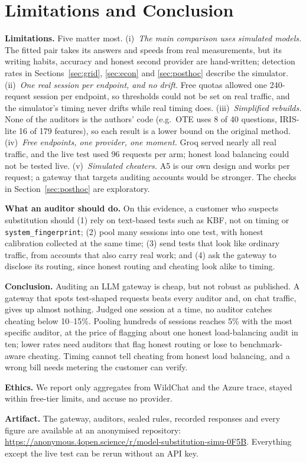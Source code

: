 \section{Limitations and Conclusion}\label{sec:conclusion}

\textbf{Limitations.} Five matter most.
(i)~\emph{The main comparison uses simulated models.} The fitted pair takes its answers and speeds
from real measurements, but its writing habits, accuracy and honest second provider are
hand-written; detection rates in Sections~\ref{sec:grid}, \ref{sec:econ} and \ref{sec:posthoc}
describe the simulator.
(ii)~\emph{One real session per endpoint, and no drift.} Free quotas allowed one 240-request session
per endpoint, so thresholds could not be set on real traffic, and the simulator's timing never drifts
while real timing does.
(iii)~\emph{Simplified rebuilds.} None of the auditors is the authors' code (e.g.\ OTE uses 8 of 40
questions, IRIS-lite 16 of 179 features), so each result is a lower bound on the original method.
(iv)~\emph{Free endpoints, one provider, one moment.} Groq served nearly all real traffic, and the
live test used 96 requests per arm; honest load balancing could not be tested live.
(v)~\emph{Simulated cheaters.} A5 is our own design and works per request; a gateway that targets
auditing accounts would be stronger. The checks in Section~\ref{sec:posthoc} are exploratory.

\textbf{What an auditor should do.} On this evidence, a customer who suspects substitution should
(1) rely on text-based tests such as KBF, not on timing or \texttt{system\_fingerprint}; (2) pool many
sessions into one test, with honest calibration collected at the same time; (3) send tests that look
like ordinary traffic, from accounts that also carry real work; and (4) ask the gateway to disclose
its routing, since honest routing and cheating look alike to timing.

\textbf{Conclusion.} Auditing an LLM gateway is cheap, but not robust as published. A gateway that
spots test-shaped requests beats every auditor and, on chat traffic, gives up almost nothing. Judged
one session at a time, no auditor catches cheating below 10--15\%. Pooling hundreds of sessions
reaches 5\% with the most specific auditor, at the price of flagging about one honest load-balancing
audit in ten; lower rates need auditors that flag honest routing or lose to benchmark-aware
cheating. Timing cannot tell cheating from honest load balancing, and a wrong bill needs metering
the customer can verify.

\textbf{Ethics.} We report only aggregates from WildChat and the Azure trace, stayed within free-tier
limits, and accuse no provider.

\textbf{Artifact.} The gateway, auditors, sealed rules, recorded responses and every figure are
available at an anonymised repository: \url{https://anonymous.4open.science/r/model-substitution-simu-0F5B}. Everything except
the live test can be rerun without an API key.
